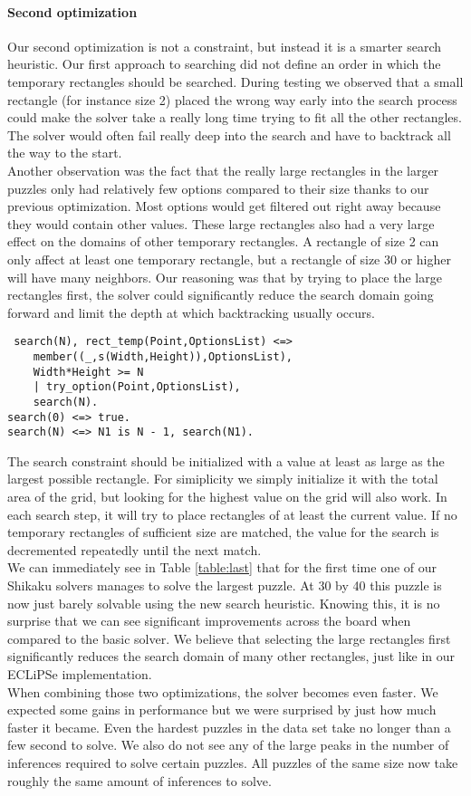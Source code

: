 \paragraph{Second optimization}
Our second optimization is not a constraint, but instead it is a smarter search heuristic. Our first approach to searching did not define an order in which the temporary rectangles should be searched. During testing we observed that a small rectangle (for instance size 2) placed the wrong way early into the search process could make the solver take a really long time trying to fit all the other rectangles. The solver would often fail really deep into the search and have to backtrack all the way to the start. \\
 Another observation was the fact that the really large rectangles in the larger puzzles only had relatively few options compared to their size thanks to our previous optimization. Most options would get filtered out right away because they would contain other values. These large rectangles also had a very large effect on the domains of other temporary rectangles. A rectangle of size 2 can only affect at least one temporary rectangle, but a rectangle of size 30 or higher will have many neighbors. Our reasoning was that by trying to place the large rectangles first, the solver could significantly reduce the search domain going forward and limit the depth at which backtracking usually occurs.
 \begin{lstlisting}
 search(N), rect_temp(Point,OptionsList) <=>
	member((_,s(Width,Height)),OptionsList),
	Width*Height >= N
	| try_option(Point,OptionsList),
	search(N).
search(0) <=> true.
search(N) <=> N1 is N - 1, search(N1).
\end{lstlisting}
The search constraint should be initialized with a value at least as large as the largest possible rectangle. For simiplicity we simply initialize it with the total area of the grid, but looking for the highest value on the grid will also work. In each search step, it will try to place rectangles of at least the current value. If no temporary rectangles of sufficient size are matched, the value for the search is decremented repeatedly until the next match. \\

We can immediately see in Table \ref{table:last} that for the first time one of our Shikaku solvers manages to solve the largest puzzle. At 30 by 40 this puzzle is now just barely solvable using the new search heuristic. Knowing this, it is no surprise that we can see significant improvements across the board when compared to the basic solver. We believe that selecting the large rectangles first significantly reduces the search domain of many other rectangles, just like in our ECLiPSe implementation. \\
When combining those two optimizations, the solver becomes even faster. We expected some gains in performance but we were surprised by just how much faster it became. Even the hardest puzzles in the data set take no longer than a few second to solve. We also do not see any of the large peaks in the number of inferences required to solve certain puzzles. All puzzles of the same size now take roughly the same amount of inferences to solve.

